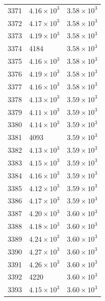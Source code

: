 \begin{table}[H]
\begin{tabular}{lll}
3371 & $\displaystyle 4.16 \times 10^{3}$ & $\displaystyle 3.58 \times 10^{3}$ \\
3372 & $\displaystyle 4.17 \times 10^{3}$ & $\displaystyle 3.58 \times 10^{3}$ \\
3373 & $\displaystyle 4.19 \times 10^{3}$ & $\displaystyle 3.58 \times 10^{3}$ \\
3374 & 4184 & $\displaystyle 3.58 \times 10^{3}$ \\
3375 & $\displaystyle 4.16 \times 10^{3}$ & $\displaystyle 3.58 \times 10^{3}$ \\
3376 & $\displaystyle 4.19 \times 10^{3}$ & $\displaystyle 3.58 \times 10^{3}$ \\
3377 & $\displaystyle 4.16 \times 10^{3}$ & $\displaystyle 3.58 \times 10^{3}$ \\
3378 & $\displaystyle 4.13 \times 10^{3}$ & $\displaystyle 3.59 \times 10^{3}$ \\
3379 & $\displaystyle 4.11 \times 10^{3}$ & $\displaystyle 3.59 \times 10^{3}$ \\
3380 & $\displaystyle 4.14 \times 10^{3}$ & $\displaystyle 3.59 \times 10^{3}$ \\
3381 & 4093 & $\displaystyle 3.59 \times 10^{3}$ \\
3382 & $\displaystyle 4.13 \times 10^{3}$ & $\displaystyle 3.59 \times 10^{3}$ \\
3383 & $\displaystyle 4.15 \times 10^{3}$ & $\displaystyle 3.59 \times 10^{3}$ \\
3384 & $\displaystyle 4.16 \times 10^{3}$ & $\displaystyle 3.59 \times 10^{3}$ \\
3385 & $\displaystyle 4.12 \times 10^{3}$ & $\displaystyle 3.59 \times 10^{3}$ \\
3386 & $\displaystyle 4.17 \times 10^{3}$ & $\displaystyle 3.59 \times 10^{3}$ \\
3387 & $\displaystyle 4.20 \times 10^{3}$ & $\displaystyle 3.60 \times 10^{3}$ \\
3388 & $\displaystyle 4.18 \times 10^{3}$ & $\displaystyle 3.60 \times 10^{3}$ \\
3389 & $\displaystyle 4.24 \times 10^{3}$ & $\displaystyle 3.60 \times 10^{3}$ \\
3390 & $\displaystyle 4.27 \times 10^{3}$ & $\displaystyle 3.60 \times 10^{3}$ \\
3391 & $\displaystyle 4.26 \times 10^{3}$ & $\displaystyle 3.60 \times 10^{3}$ \\
3392 & 4220 & $\displaystyle 3.60 \times 10^{3}$ \\
3393 & $\displaystyle 4.15 \times 10^{3}$ & $\displaystyle 3.60 \times 10^{3}$ \\

\end{tabular}
\end{table}
